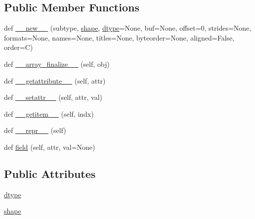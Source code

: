 \subsection*{Public Member Functions}
\begin{DoxyCompactItemize}
\item 
def \hyperlink{classnumpy_1_1core_1_1records_1_1recarray_a2f63dd539ba1c8fb07d764ce219429d2}{\+\_\+\+\_\+new\+\_\+\+\_\+} (subtype, \hyperlink{classnumpy_1_1core_1_1records_1_1recarray_a13fed5b032b4bc1284b4e6f2848d49c7}{shape}, \hyperlink{classnumpy_1_1core_1_1records_1_1recarray_a02467375a9bff660dada72aabf09713e}{dtype}=None, buf=None, offset=0, strides=None, formats=None, names=None, titles=None, byteorder=None, aligned=False, order=\textquotesingle{}C\textquotesingle{})
\item 
def \hyperlink{classnumpy_1_1core_1_1records_1_1recarray_a0f0d7c04057cd35a49b9904c79948b5e}{\+\_\+\+\_\+array\+\_\+finalize\+\_\+\+\_\+} (self, obj)
\item 
def \hyperlink{classnumpy_1_1core_1_1records_1_1recarray_a990406e27481dd2428bc811d3fc62758}{\+\_\+\+\_\+getattribute\+\_\+\+\_\+} (self, attr)
\item 
def \hyperlink{classnumpy_1_1core_1_1records_1_1recarray_af335d8719a08d4958da41e5f00778921}{\+\_\+\+\_\+setattr\+\_\+\+\_\+} (self, attr, val)
\item 
def \hyperlink{classnumpy_1_1core_1_1records_1_1recarray_a4800307fced90ca9bf5f48f978c5722c}{\+\_\+\+\_\+getitem\+\_\+\+\_\+} (self, indx)
\item 
def \hyperlink{classnumpy_1_1core_1_1records_1_1recarray_a241f84055c29d3aeaca584e15f69b9b5}{\+\_\+\+\_\+repr\+\_\+\+\_\+} (self)
\item 
def \hyperlink{classnumpy_1_1core_1_1records_1_1recarray_aa91d3d470efbf3b5e9c2c831e97818da}{field} (self, attr, val=None)
\end{DoxyCompactItemize}
\subsection*{Public Attributes}
\begin{DoxyCompactItemize}
\item 
\hyperlink{classnumpy_1_1core_1_1records_1_1recarray_a02467375a9bff660dada72aabf09713e}{dtype}
\item 
\hyperlink{classnumpy_1_1core_1_1records_1_1recarray_a13fed5b032b4bc1284b4e6f2848d49c7}{shape}
\end{DoxyCompactItemize}


